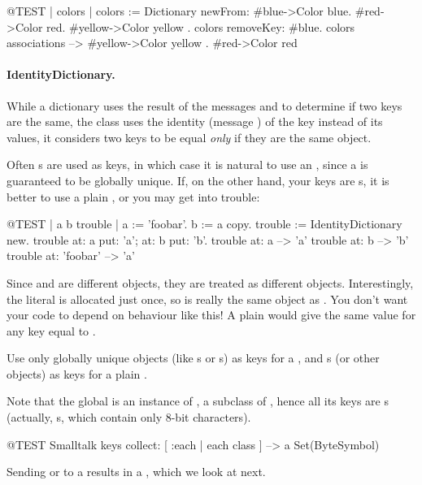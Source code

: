 \documentclass[a4paper,10pt,twoside]{book}
\begin{document}
\begin{code}{@TEST | colors |}
colors := Dictionary newFrom: { #blue->Color blue. #red->Color red. #yellow->Color yellow }.
colors removeKey: #blue.
colors associations --> {#yellow->Color yellow . #red->Color red}
\end{code}

\paragraph{IdentityDictionary.}
While a dictionary uses the result of the messages \ct{=} and  to determine if two keys are the same, the class  uses the identity (message ) of the key instead of its values, \ie it considers two keys to be equal \emph{only} if they are the same object.

Often s are used as keys, in which case it is natural to use an , since a  is guaranteed to be globally unique.
If, on the other hand, your keys are s, it is better to use a plain , or you may get into trouble:

\begin{code}{@TEST | a b trouble |}
a := 'foobar'.
b := a copy.
trouble := IdentityDictionary new.
trouble at: a put: 'a'; at: b put: 'b'.
trouble at: a          --> 'a'
trouble at: b          --> 'b'
trouble at: 'foobar' --> 'a'
\end{code}

\noindent
Since  and  are different objects, they are treated as different objects.
Interestingly, the literal \mbox{} is allocated just once, so is really the same object as .
You don't want your code to depend on behaviour like this!
A plain  would give the same value for any key equal to .

Use only globally unique objects (like s or s) as keys for a , and s (or other objects) as keys for a plain .


Note that the global  is an instance of , a subclass of , hence all its keys are s (actually, s, which contain only 8-bit characters).

\begin{code}{@TEST}
Smalltalk keys collect: [ :each | each class ] --> a Set(ByteSymbol)
\end{code}
\noindent
Sending  or  to a  results in a , which we look at next.
\end{document}
